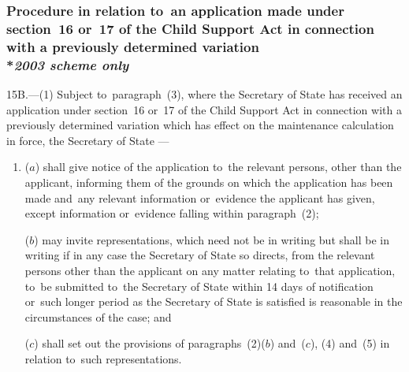 \documentclass[12pt,a4paper]{article}
\begin{document}
\subsubsection[15B. Procedure in relation to~an application made under section~16 or~17 of the Child Support Act in connection with a previously determined variation]{Procedure in relation to~an application made under section~16 or~17 of the Child Support Act in connection with a previously determined variation\\*\emph{2003 scheme only}}

15B.---(1)  Subject to~paragraph~(3), where the 
Secretary of State  %
has received an application under section~16 or~17 of the Child Support Act in connection with a previously determined variation which has effect on the maintenance calculation in force, 
the Secretary of State%
—
\begin{enumerate}\item[]
($a$) shall give notice of the application to~the relevant persons, other than the applicant, informing them of the grounds on which the application has been made and~any relevant information or~evidence the applicant has given, except information or~evidence falling within paragraph~(2);

($b$) may invite representations, which need not be in writing but shall be in writing if in any case 
the Secretary of State  %
so directs, from the relevant persons other than the applicant on any matter relating to~that application, to~be submitted to~the 
Secretary of State  %
within 14 days of notification or~such longer period as the 
Secretary of State  %
is satisfied is reasonable in the circumstances of the case; and

($c$) shall set out the provisions of paragraphs~(2)($b$)  and~($c$), (4) and~(5) in relation to~such representations.
\end{enumerate}
\end{document}
